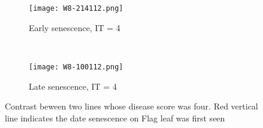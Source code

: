 \documentclass{frontiersSCNS} %
\begin{document}
\begin{figure}
    \begin{center}
    \begin{subfigure}[b]{0.5\textwidth}
        \texttt{[image: W8-214112.png]}
        \caption{Early senescence, IT = 4}
    \end{subfigure}
    ~ %
    \begin{subfigure}[b]{0.5\textwidth}
        \texttt{[image: W8-100112.png]}
        \caption{Late senescence, IT = 4}
    \end{subfigure}
\end{center}
    \caption{Contrast beween two lines whose disease score was four. Red vertical line indicates the date senescence on Flag leaf was first seen}\label{fig3}
\end{figure}





\end{document}
